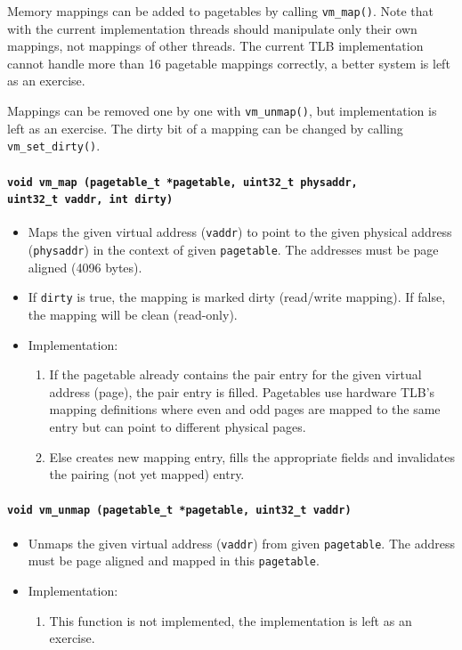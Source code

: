 \documentclass[twoside,a4paper]{report}
\makeatletter
\newenvironment{function}[3]{%
\paragraph{\texttt{#1 {\textbf{#2}} (#3)}}%
\index{#2@\texttt{#2}}%
\begin{itemize}%
}{%
\end{itemize}%
}
\newcommand{\brtab}{\\\hspace*{1cm}}
\makeatother
\begin{document}
   Memory mappings can be added to pagetables by calling
\texttt{vm\_map()}. Note that with the current implementation threads
should manipulate only their own mappings, not mappings of other
threads. The current TLB implementation cannot handle more than 16
pagetable mappings correctly, a better system is left as an exercise.

Mappings can be removed one by one with \texttt{vm\_unmap()}, but
implementation is left as an exercise. The dirty bit of a mapping can
be changed by calling \texttt{vm\_set\_dirty()}.

\begin{function}{void}{vm\_map}{pagetable\_t *pagetable, 
uint32\_t physaddr,\brtab uint32\_t vaddr, int dirty}

\item Maps the given virtual address (\texttt{vaddr}) to point to the
given physical address (\texttt{physaddr}) in the context of given
\texttt{pagetable}. The addresses must be page aligned (4096 bytes).

\item If \texttt{dirty} is true, the mapping is marked dirty
(read/write mapping). If false, the mapping will be clean (read-only).

\item Implementation:
\begin{enumerate}

\item If the pagetable already contains the pair entry for the given virtual
address (page), the pair entry is filled. Pagetables use hardware
TLB's mapping definitions where even and odd pages are mapped to the
same entry but can point to different physical pages.

\item Else creates new mapping entry, fills the appropriate fields and
invalidates the pairing (not yet mapped) entry.

\end{enumerate}
\end{function}


\begin{function}{void}{vm\_unmap}{pagetable\_t *pagetable, uint32\_t vaddr}

\item Unmaps the given virtual address (\texttt{vaddr}) from given
\texttt{pagetable}. The address must be page aligned and mapped in this
\texttt{pagetable}.

\item Implementation:
\begin{enumerate}

\item This function is not implemented, the implementation is left as
an exercise.

\end{enumerate}
\end{function}
\end{document}
